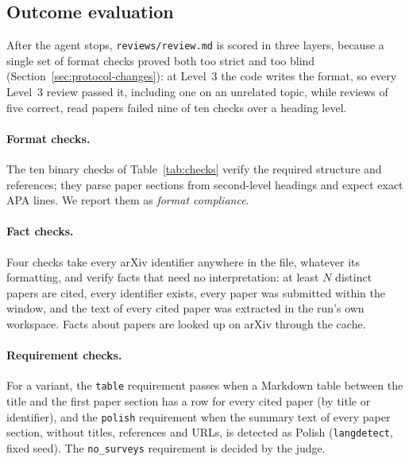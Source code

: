 \subsection{Outcome evaluation}
\label{sec:evaluation}

After the agent stops, \texttt{reviews/review.md} is scored in three layers, because a single set of format checks proved both too strict and too blind (Section~\ref{sec:protocol-changes}): at Level~3 the code writes the format, so every Level~3 review passed it, including one on an unrelated topic, while reviews of five correct, read papers failed nine of ten checks over a heading level.

\paragraph{Format checks.} The ten binary checks of Table~\ref{tab:checks} verify the required structure and references; they parse paper sections from second-level headings and expect exact APA lines. We report them as \emph{format compliance}.

\paragraph{Fact checks.} Four checks take every arXiv identifier anywhere in the file, whatever its formatting, and verify facts that need no interpretation: at least $N$ distinct papers are cited, every identifier exists, every paper was submitted within the window, and the text of every cited paper was extracted in the run's own workspace. Facts about papers are looked up on arXiv through the cache.

\paragraph{Requirement checks.} For a variant, the \texttt{table} requirement passes when a Markdown table between the title and the first paper section has a row for every cited paper (by title or identifier), and the \texttt{polish} requirement when the summary text of every paper section, without titles, references and URLs, is detected as Polish (\texttt{langdetect}, fixed seed). The \texttt{no\_surveys} requirement is decided by the judge.

